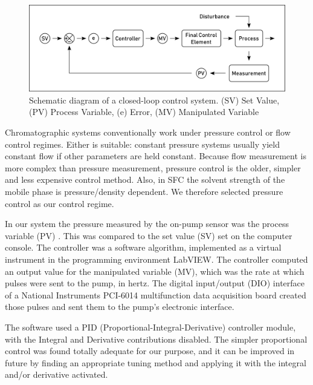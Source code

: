 \begin{figure}
\centering
\includegraphics[width=\textwidth]{Figures/ProcessControl.pdf}
\decoRule

\caption[A process control system]{Schematic diagram of a closed-loop control
system. (SV) Set Value, (PV) Process Variable, (e) Error, (MV) Manipulated
Variable}

\label{fig:processcontrol}
\end{figure}

Chromatographic systems conventionally work under pressure control or flow
control regimes. Either is suitable: constant pressure systems usually yield
constant flow if other parameters are held constant. Because flow measurement is
more complex than pressure measurement, pressure control is the older, simpler
and less expensive control method. Also, in SFC the solvent strength of the mobile
phase is pressure/density dependent. We therefore selected pressure control
as our control regime.

In our system the pressure measured by the on-pump sensor was the process
variable (PV) . This was compared to the set value (SV) set on the computer
console. The controller was a software algorithm, implemented as a virtual
instrument in the programming environment LabVIEW. The controller computed an
output value for the manipulated variable (MV), which was the rate at which
pulses were sent to the pump, in hertz. The digital input/output (DIO) interface
of a National Instruments PCI-6014 multifunction data acquisition board created
those pulses and sent them to the pump's electronic interface.

The software used a PID (Proportional-Integral-Derivative) controller module,
with the Integral and Derivative contributions disabled. The simpler
proportional control was found totally adequate for our purpose, and it can be
improved in future by finding an appropriate tuning method and applying it with
the integral and/or derivative activated.


